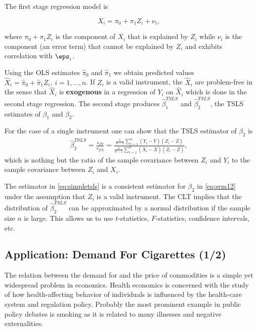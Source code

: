 \documentclass[
  letterpaper,
  DIV=11,
  numbers=noendperiod]{scrreprt}
\theoremstyle{definition}
\theoremstyle{plain}
\theoremstyle{plain}
\theoremstyle{remark}
\begin{document}
{The first stage regression model is

\[
X_i = \pi_0 + \pi_1 Z_i + \nu_i,
\]

where \(\pi_0 + \pi_1 Z_i\) is the component of \(X_i\) that is
explained by \(Z_i\) while \(\nu_i\) is the component (an error term)
that cannot be explained by \(Z_i\) and exhibits correlation with
\(\eps_i\).

Using the OLS estimates \(\widehat{\pi}_0\) and \(\widehat{\pi}_1\) we
obtain predicted values
\(\widehat{X}_i=\hat\pi_0+\hat\pi_1 Z_i,\ i=1,\dots,n\). If \(Z_i\) is a
valid instrument, the \(\widehat{X}_i\) are problem-free in the sense
that \(\widehat{X}_i\) is \textbf{exogenous} in a regression of \(Y_i\)
on \(\widehat{X}_i\) which is done in the second stage regression. The
second stage produces \(\widehat{\beta}_1^{TSLS}\) and
\(\widehat{\beta}_2^{TSLS}\), the TSLS estimates of \(\beta_1\) and
\(\beta_2\).

For the case of a single instrument one can show that the TSLS estimator
of \(\beta_2\) is \begin{align}
\widehat{\beta}_2^{TSLS} = \frac{s_{ZY}}{s_{ZX}} = \frac{\frac{1}{n-1}\sum_{i=1}^n(Y_i - \overline{Y})(Z_i - \overline{Z})}{\frac{1}{n-1}\sum_{i=1}^n(X_i - \overline{X})(Z_i - \overline{Z})}, \label{eq:simpletsls}
\end{align} which is nothing but the ratio of the sample covariance
between \(Z_i\) and \(Y_i\) to the sample covariance between \(Z_i\) and
\(X_i\).

The estimator in \eqref{eq:simpletsls} is a consistent estimator for
\(\beta_2\) in \eqref{eq:srm12} under the assumption that \(Z_i\) is a
valid instrument. The CLT implies that the distribution of
\(\widehat{\beta}_2^{TSLS}\) can be approximated by a normal
distribution if the sample size \(n\) is large. This allows us to use
\(t\)-statistics, \(F\)-statistics, confidence intervals, etc.

\hypertarget{application-demand-for-cigarettes-12}{%
\subsection{Application: Demand For Cigarettes
(1/2)}\label{application-demand-for-cigarettes-12}}

The relation between the demand for and the price of commodities is a
simple yet widespread problem in economics. Health economics is
concerned with the study of how health-affecting behavior of individuals
is influenced by the health-care system and regulation policy. Probably
the most prominent example in public policy debates is smoking as it is
related to many illnesses and negative externalities.

}
\end{document}
